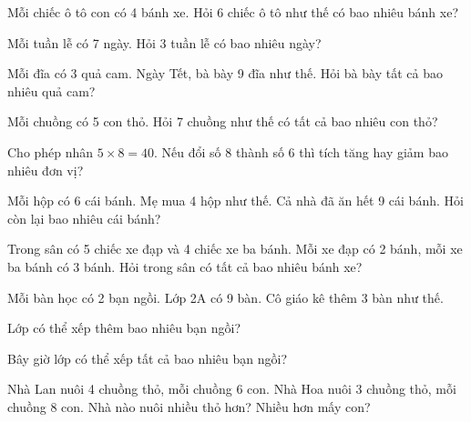 \documentclass[../main.tex]{subfiles}
\begin{document}
\begin{bt}
    Mỗi chiếc ô tô con có 4 bánh xe. Hỏi 6 chiếc ô tô như thế có bao nhiêu bánh xe?
\end{bt}

\begin{bt}
    Mỗi tuần lễ có 7 ngày. Hỏi 3 tuần lễ có bao nhiêu ngày?
\end{bt}

\begin{bt}
    Mỗi đĩa có 3 quả cam. Ngày Tết, bà bày 9 đĩa như thế. Hỏi bà bày tất cả bao nhiêu quả cam?
\end{bt}

\begin{bt}
    Mỗi chuồng có 5 con thỏ. Hỏi 7 chuồng như thế có tất cả bao nhiêu con thỏ?
\end{bt}

\begin{bt}
    Cho phép nhân $5 \times 8 = 40$. Nếu đổi số 8 thành số 6 thì tích tăng hay giảm bao nhiêu đơn vị?
\end{bt}

\begin{bt}
    Mỗi hộp có 6 cái bánh. Mẹ mua 4 hộp như thế. Cả nhà đã ăn hết 9 cái bánh. Hỏi còn lại bao nhiêu cái bánh?
\end{bt}

\begin{bt}
    Trong sân có 5 chiếc xe đạp và 4 chiếc xe ba bánh. Mỗi xe đạp có 2 bánh, mỗi xe ba bánh có 3 bánh. Hỏi trong sân có tất cả bao nhiêu bánh xe?
\end{bt}
\newpage
\begin{bt}
    Mỗi bàn học có 2 bạn ngồi. Lớp 2A có 9 bàn. Cô giáo kê thêm 3 bàn như thế.
    \begin{listEX}
        \item Lớp có thể xếp thêm bao nhiêu bạn ngồi?
        \item Bây giờ lớp có thể xếp tất cả bao nhiêu bạn ngồi?
    \end{listEX}
\end{bt}

\begin{bt}
    Nhà Lan nuôi 4 chuồng thỏ, mỗi chuồng 6 con. Nhà Hoa nuôi 3 chuồng thỏ, mỗi chuồng 8 con. Nhà nào nuôi nhiều thỏ hơn? Nhiều hơn mấy con?
\end{bt}
\providecommand{\TTnguon}{}\renewcommand{\TTnguon}[1]{{\small\itshape\color{black!55}(#1)}}
\end{document}
